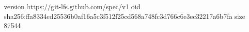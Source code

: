 version https://git-lfs.github.com/spec/v1
oid sha256:ffa8334ed25536b0af16a5c3f512f25cd568a748fc3d766c6e3ec32217a6b7fa
size 87544
